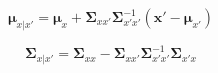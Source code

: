 \documentclass[]{article}
\begin{document}
\begin{equation} 
\bm{\mu}_{x|x'} = \bm{\mu}_{x} + \bm{\Sigma}_{xx'}\bm{\Sigma}_{x'x'}^{-1}(\bm{x}'-\bm{\mu}_{x'})
\end{equation}

\begin{equation}\bm{\Sigma}_{x|x'} = \bm{\Sigma}_{xx} -\bm{\Sigma}_{xx'}\bm{\Sigma}_{x'x'}^{-1}\bm{\Sigma}_{x'x} \end{equation}






\begin{equation} 
\end{equation}
  
  
\end{document}

